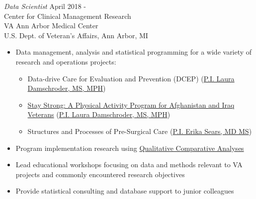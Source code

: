 \documentclass[10pt]{res} %
\begin{document}
\begin{resume}
{\sl Data Scientist} \hfill April 2018 - \\
Center for Clinical Management Research \\
VA Ann Arbor Medical Center \\
U.S. Dept. of Veteran's Affairs, Ann Arbor, MI
\begin{itemize}
    \item Data management, analysis and statistical programming for a wide variety of research and operations projects:
    \begin{itemize}
	\item Data-drive Care for Evaluation and Prevention (DCEP) (\href{https://www.academyhealth.org/node/17955}{P.I. Laura Damschroder, MS, MPH})
           \item \href{https://clinicaltrials.gov/ct2/show/NCT02360293}{Stay Strong: A Physical Activity Program for Afghanistan and Iraq Veterans} (\href{https://www.academyhealth.org/node/17955}{P.I. Laura Damschroder, MS, MPH})
	\item Structures and Processes of Pre-Surgical Care (\href{https://www.uofmhealth.org/profile/4123/erika-davis-sears-md}{P.I. Erika Sears, MD MS})
    \end{itemize}
    \item Program implementation research using \href{http://compasss.org/}{Qualitative Comparative Analyses}
    \item Lead educational workshops focusing on data and methods relevant to VA projects and commonly encountered research objectives
    \item Provide statistical consulting and database support to junior colleagues
\end{itemize}


\end{resume}
\end{document}
